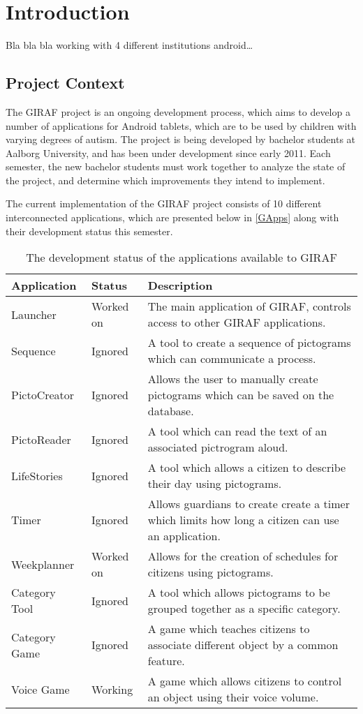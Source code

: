 \chapter{Introduction}

Bla bla bla working with 4 different institutions
android\ldots


\section{Project Context}
The GIRAF project is an ongoing development process, which aims to develop a
number of applications for Android tablets, which are to be used by children
with varying degrees of autism. The project is being developed by bachelor students
at Aalborg University, and has been under development since early 2011. Each
semester, the new bachelor students must work together to analyze the state of
the project, and determine which improvements they intend to implement.\nl

The current implementation of the GIRAF project consists of 10 different
interconnected applications, which are presented below in \autoref{GApps} along
with their development status this semester.

\begin{table}[H]
\centering
\begin{tabular}{|p{2.8cm}|p{2.2cm}|p{7cm}|}
\hline
Application			& Status & Description \\\hline
Launcher  			& Worked on & The main application of GIRAF, controls access
to other GIRAF applications. \\\hline 
Sequence	       	& Ignored & A tool to create a sequence of pictograms which can
communicate a process.\\\hline 
PictoCreator  	   	& Ignored & Allows the user to manually create pictograms
which can be saved on the database.\\\hline
PictoReader	   		& Ignored & A tool which can read the text of an associated
pictrogram aloud.\\\hline
LifeStories	   		& Ignored & A tool which allows a citizen to describe their day
using pictograms.\\\hline 
Timer     	   		& Ignored & Allows guardians to create create a timer which
limits how long a citizen can use an application.\\\hline 
Weekplanner 		& Worked on & Allows for the creation of schedules for citizens
using pictograms. \\\hline 
Category Tool		& Ignored & A tool which allows pictograms to be grouped together
as a specific category. \\\hline 
Category Game   	& Ignored & A game which teaches citizens to associate
different object by a common feature. \\\hline 
Voice Game  		& Working & A game which allows citizens to control an object
using their voice volume. \\\hline
\end{tabular} 
\caption{The development status of the applications available to GIRAF}
\label{GApps}
\end{table}

